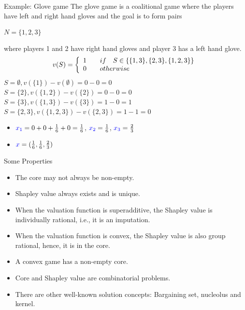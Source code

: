\documentclass{beamer}
\begin{document}
\begin{frame} {Example: Glove game}
    The {\color{blue}glove game} is a coalitional game where the players have left and right hand gloves and the goal is to form pairs
    \begin{center}
      $N = \{1,2,3\}$ \\
    \end{center}
    where players 1 and 2 have right hand gloves and player 3 has a left hand glove.
    \[ v(S) = \left\{
      \begin{array}{l l}
        1 & \quad if \quad S \in \{\{1,3\},\{2,3\},\{1,2,3\}\} \\
        0 & \quad otherwise        
      \end{array} \right.\]      
    $S = \emptyset, v(\{1\}) - v(\emptyset) = 0 - 0 = 0$ \\    
    $S = \{2\}, v(\{1,2\}) - v(\{2\}) = 0 - 0 = 0$ \\
    $S = \{3\}, v(\{1,3\}) - v(\{3\}) = 1 - 0 = 1$ \\
    $S = \{2,3\}, v(\{1,2,3\}) - v(\{2,3\}) = 1 - 1 = 0$ \\            
    \begin{itemize}
        \item ${\color{blue}x_1} = 0 + 0 + \frac{1}{6} + 0 = \frac{1}{6}$, ${\color{blue}x_2} = \frac{1}{6}$, ${\color{blue}x_3} = \frac{2}{3}$    
        \item ${\color{blue}x} = (\frac{1}{6}, \frac{1}{6}, \frac{2}{3})$
    \end{itemize}
\end{frame}

\begin{frame}{Some Properties}
    \begin{itemize}
        \item The core may not always be non-empty.
        \item Shapley value always exists and is unique.
        \item When the valuation function is {\color{blue}superadditive}, the Shapley value is {\color{blue}individually rational}, i.e., it is an imputation.
        \item When the valuation function is {\color{blue}convex}, the Shapley value is also group rational, hence, it is in the {\color{blue}core}.
        \item A convex game has a non-empty core.
        \item Core and Shapley value are combinatorial problems.
        \item There are other well-known solution concepts: Bargaining set, nucleolus and kernel.
    \end{itemize}
\end{frame}
\end{document}
